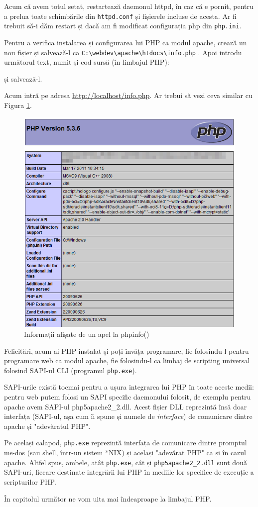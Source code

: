 Acum că avem totul setat, restartează daemonul httpd, în caz că e pornit, pentru a prelua
toate schimbările din \texttt{httpd.conf} și fișierele incluse de acesta. Ar fi trebuit să-i
dăm restart și dacă am fi modificat configurația php din \texttt{php.ini}.

Pentru a verifica instalarea și configurarea lui PHP ca modul apache, crează un nou fișier
și salvează-l ca 
\texttt{C:{\textbackslash}webdev{\textbackslash}apache{\textbackslash}htdocs{\textbackslash}info.php}
. Apoi introdu următorul text, numit și cod sursă (în limbajul PHP):

și salvează-l. 

Acum intră pe adresa \url{http://localhost/info.php}. Ar trebui să vezi ceva similar cu Figura \ref{img:php phpinfo}.

\begin{figure}[ht!]
  \centering
    \includegraphics[width=300bp]{cap01/Screenshot-15.png}
  \caption{Informații afișate de un apel la phpinfo()}
  \label{img:php phpinfo}
\end{figure}

Felicitări, acum ai PHP instalat și poți învăța programare, fie folosindu-l pentru programare web
ca modul apache, fie folosindu-l ca limbaj de scripting universal folosind SAPI-ul CLI (programul \texttt{php.exe}).

SAPI-urile există tocmai pentru a ușura integrarea lui PHP în toate aceste medii: pentru web putem folosi
un SAPI specific daemonului folosit, de exemplu pentru apache avem SAPI-ul php5apache2\_2.dll.
Acest fișier DLL reprezintă însă doar interfața (SAPI-ul, așa cum îi spune și numele de \textsl{interface})
de comunicare dintre apache și "adevăratul PHP".

Pe același calapod, \texttt{php.exe} reprezintă interfața de comunicare dintre promptul ms-dos
(sau shell, într-un sistem *NIX) și același "adevărat PHP" ca și în cazul apache. Altfel spus,
ambele, atât \texttt{php.exe}, cât și \texttt{php5apache2\_2.dll} sunt două SAPI-uri,
fiecare destinate integrării lui PHP în mediile lor specifice de execuție a scripturilor PHP.

În capitolul următor ne vom uita mai îndeaproape la limbajul PHP.
